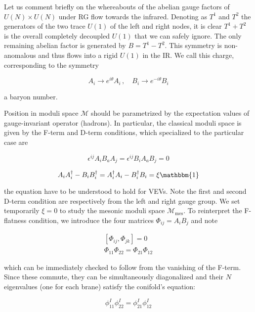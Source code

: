 Let us comment briefly on the whereabouts of the abelian gauge factors of $U(N) \times U(N)$ under RG flow towards the infrared. Denoting as $T^1$ and $T^2$ the generators of the two trace $U(1)$ of the left and right nodes, it is clear $T^1+T^2$ is the overall completely decoupled $U(1)$ that we can safely ignore. The only remaining abelian factor is generated by $B = T^1 - T^2$. This symmetry is non-anomalous and thus flows into a rigid $U(1)$ in the IR. We call this charge, corresponding to the symmetry

\begin{equation}
	A_i \rightarrow e^{i\theta} A_i\,,\quad B_i \rightarrow e^{-i\theta} B_i
	\label{}
\end{equation}

a baryon number.

Position in moduli space $\mathcal{M}$ should be parametrized by the expectation values of gauge-invariant operator (hadrons). In particular, the classical moduli space is given by the F-term and D-term conditions, which specialized to the particular case are

\begin{equation}
	\epsilon^{ij} A_i B_a A_j = \epsilon^{ij} B_i A_a B_j = 0
	\label{}
\end{equation}

\begin{equation}
	A_i A_i^\dagger - B_i B_i^\dagger = A^\dagger_i A_i - B^\dagger_i B_i = \xi \mathbbm{1}
	\label{}
\end{equation}

the equation have to be understood to hold for VEVs. Note the first and second D-term condition are respectively from the left and right gauge group. We set temporarily $\xi = 0$ to study the mesonic moduli space $\mathcal{M}_\text{mes}$. To reinterpret the F-flatness condition, we introduce the four matrices $\Phi_{ij} = A_i B_j$ and note

\begin{align}
	\left[ \Phi_{ij} , \Phi_{jk} \right] = 0\\
	\Phi_{11} \Phi_{22} = \Phi_{21}\Phi_{12}
	\label{}
\end{align}

which can be immediately checked to follow from the vanishing of the F-term. Since these commute, they can be simultaneously diagonalized and their $N$ eigenvalues (one for each brane) satisfy the conifold's equation:

\begin{equation}
	\phi^I_{11} \phi^I_{22} = \phi_{21}^I \phi_{12}^I
	\label{}
\end{equation}

